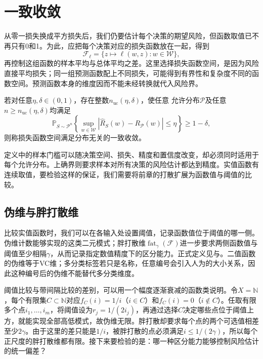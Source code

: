 \section{一致收敛}
\label{sec:real-valued-classes}

从零一损失换成平方损失后，我们仍要估计每个决策的期望风险，但函数取值已不再只有0和1。为此，应把每个决策对应的损失函数放在一起，得到
\[
 \mathcal F_\ell=\{z\mapsto\ell(w,z):w\in\mathcal W\},
\]
再控制这组函数的样本平均与总体平均之差。这里选择损失函数空间，是因为风险直接平均损失；同一组预测函数配上不同损失，可能得到有界性和复杂度不同的函数空间。预测函数本身的维度因而不能未经转换就代入风险界。

\begin{definition}[一般学习问题的一致收敛]
\label{def:general-uniform-convergence}
若对任意$\eta,\delta\in(0,1)$，存在整数$n_{\mathrm{uc}}(\eta,\delta)$，使任意
允许分布$\mathcal P$及任意$n\geq n_{\mathrm{uc}}(\eta,\delta)$均满足
\[
 \mathbb P_{S\sim\mathcal P^n}\!\left\{
 \sup_{w\in\mathcal W}|\hat R_S(w)-R_{\mathcal P}(w)|\leq\eta
 \right\}\geq1-\delta,
\]
则称损失函数空间满足分布无关的一致收敛。
\end{definition}

定义中的样本门槛可以随决策空间、损失、精度和置信度改变，却必须同时适用于每个允许分布。上确界则要求样本对所有决策的风险估计都达到精度。实值函数有连续取值，要检验这样的保证，我们需要将前章的打散扩展为函数值与阈值的比较。

\subsection{伪维与胖打散维}

比较实值函数时，我们可以在各输入处设置阈值，记录函数值位于阈值的哪一侧。伪维计数能够实现的这类二元模式；胖打散维$\operatorname{fat}_\gamma(\mathcal F)$进一步要求两侧函数值与阈值至少相隔$\gamma$，从而记录指定数值精度下的区分能力。正式定义见与。二值函数的伪维等于VC维；多分类标签若只是名称，任意编号会引入人为的大小关系，因此这种编号后的伪维不能替代多分类维度。

阈值比较与带间隔比较的差别，可以用一个幅度逐渐衰减的函数类说明。令$X=\mathbb N$，每个有限集$C\subset\mathbb N$对应$f_C(i)=1/i$（$i\in C$）和$f_C(i)=0$（$i\notin C$）。任取有限多个点$i_1,\ldots,i_m$，将阈值设为$r_j=1/(2i_j)$，再通过选择$C$决定哪些点位于阈值上方，就能实现全部高低模式，故伪维无限。胖打散却要求每个点的两个可选值相差至少$2\gamma$。由于这里的差只能是$1/i$，被胖打散的点必须满足$i\leq1/(2\gamma)$，所以每个正尺度的胖打散维都有限。接下来要检验的是：哪一种区分能力能够控制风险估计的统一偏差？

